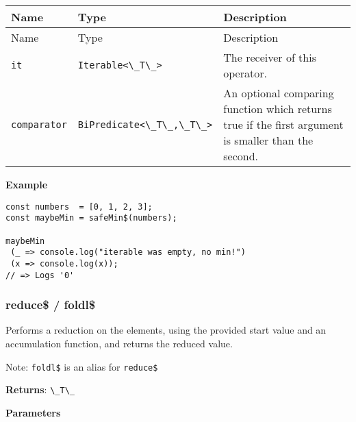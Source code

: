 \begin{longtable}[]{
  >{\raggedright\arraybackslash}p{}
  >{\raggedright\arraybackslash}p{}
  >{\raggedright\arraybackslash}p{}@{}}

\toprule\noalign{}
Name & Type & Description \\
\midrule\noalign{}
\endfirsthead
\toprule\noalign{}
Name & Type & Description \\
\midrule\noalign{}
\endhead
\bottomrule\noalign{}
\endlastfoot
\passthrough{\lstinline!it!} & \passthrough{\lstinline!Iterable<\_T\_>!}
& The receiver of this operator. \\
\passthrough{\lstinline!comparator!} &
\passthrough{\lstinline!BiPredicate<\_T\_,\_T\_>!} & An optional
comparing function which returns true if the first argument is smaller
than the second. \\
\end{longtable}

\textbf{Example}

\begin{lstlisting}[label=fa712c67-7a58-4fdf-a963-b5c88f702251]
const numbers  = [0, 1, 2, 3];
const maybeMin = safeMin$(numbers);
                                                 
maybeMin
 (_ => console.log("iterable was empty, no min!")
 (x => console.log(x));
// => Logs '0'
\end{lstlisting}

\hypertarget{8e9a31f3-adef-4efe-b6bd-884d685ebc44}{%
\subsubsection{reduce\$ /
foldl\$}\label{8e9a31f3-adef-4efe-b6bd-884d685ebc44}}

Performs a reduction on the elements, using the provided start value and
an accumulation function, and returns the reduced value.

Note: \passthrough{\lstinline!foldl$!} is an alias for
\passthrough{\lstinline!reduce$!}

\textbf{Returns}: \passthrough{\lstinline!\_T\_!}

\textbf{Parameters}

